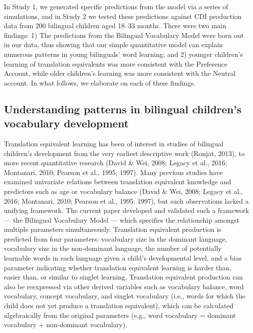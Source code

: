 \documentclass[
  english,
  ,man,floatsintext]{apa6}
\begin{document}
In Study 1, we generated specific predictions from the model via a series of simulations, and in Study 2 we tested these predictions against CDI production data from 200 bilingual children aged 18--33 months. There were two main findings: 1) The predictions from the Bilingual Vocabulary Model were born out in our data, thus showing that our simple quantitative model can explain numerous patterns in young bilinguals' word learning; and 2) younger children's learning of translation equivalents was more consistent with the Preference Account, while older children's learning was more consistent with the Neutral account. In what follows, we elaborate on each of these findings.

\hypertarget{understanding-patterns-in-bilingual-childrens-vocabulary-development}{%
\subsection{Understanding patterns in bilingual children's vocabulary development}\label{understanding-patterns-in-bilingual-childrens-vocabulary-development}}

Translation equivalent learning has been of interest in studies of bilingual children's development from the very earliest descriptive work (Ronjat, 2013), to more recent quantitative research (David \& Wei, 2008; Legacy et al., 2016; Montanari, 2010; Pearson et al., 1995; 1997). Many previous studies have examined univariate relations between translation equivalent knowledge and predictors such as age or vocabulary balance (David \& Wei, 2008; Legacy et al., 2016; Montanari, 2010; Pearson et al., 1995; 1997), but such observations lacked a unifying framework. The current paper developed and validated such a framework --- the Bilingual Vocabulary Model --- which specifies the relationship amongst multiple parameters simultaneously. Translation equivalent production is predicted from four parameters: vocabulary size in the dominant language, vocabulary size in the non-dominant language, the number of potentially learnable words in each language given a child's developmental level, and a bias parameter indicating whether translation equivalent learning is harder than, easier than, or similar to singlet learning. Translation equivalent production can also be reexpressed via other derived variables such as vocabulary balance, word vocabulary, concept vocabulary, and singlet vocabulary (i.e., words for which the child does not yet produce a translation equivalent), which can be calculated algebraically from the original parameters (e.g., word vocabulary = dominant vocabulary + non-dominant vocabulary).
\end{document}
